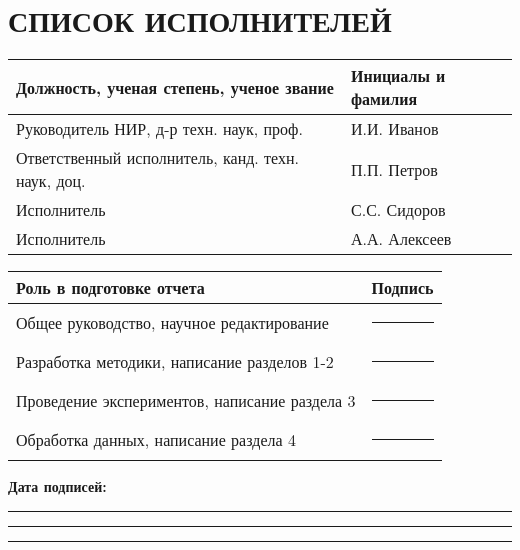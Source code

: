 \chapter*{СПИСОК ИСПОЛНИТЕЛЕЙ}

\begin{center}
\begin{tabular}{p{8cm}p{6cm}}
\hline
\textbf{Должность, ученая степень, ученое звание} & \textbf{Инициалы и фамилия} \\
\hline
Руководитель НИР, д-р техн. наук, проф. & И.И. Иванов \\
\hline
Ответственный исполнитель, канд. техн. наук, доц. & П.П. Петров \\
\hline
Исполнитель & С.С. Сидоров \\
\hline
Исполнитель & А.А. Алексеев \\
\hline
\end{tabular}
\end{center}

\vspace{1cm}

\begin{center}
\begin{tabular}{p{8cm}p{6cm}}
\hline
\textbf{Роль в подготовке отчета} & \textbf{Подпись} \\
\hline
Общее руководство, научное редактирование & \rule{4cm}{0.4pt} \\
\hline
Разработка методики, написание разделов 1-2 & \rule{4cm}{0.4pt} \\
\hline
Проведение экспериментов, написание раздела 3 & \rule{4cm}{0.4pt} \\
\hline
Обработка данных, написание раздела 4 & \rule{4cm}{0.4pt} \\
\hline
\end{tabular}
\end{center}

\vspace{1cm}

\begin{center}
\textbf{Дата подписей:} \rule{3cm}{0.4pt} \rule{3cm}{0.4pt} \rule{3cm}{0.4pt}
\end{center}

\newpage
